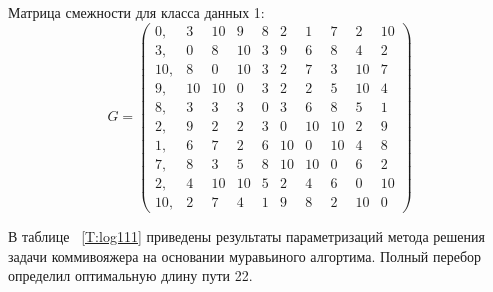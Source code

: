 \documentclass[a4paper,12pt]{article}
\begin{document}
		    Матрица смежности для класса данных 1:
		    \begin{equation*}
		    	G = 
			    \begin{pmatrix}
			    	0,      &3      &10     &9      &8      &2      &1      &7      &2      &10     \\
			    	3,      &0      &8      &10     &3      &9      &6      &8      &4      &2      \\
			    	10,     &8      &0      &10     &3      &2      &7      &3      &10     &7      \\
			    	9,      &10     &10     &0      &3      &2      &2      &5      &10     &4      \\
			    	8,      &3      &3      &3      &0      &3      &6      &8      &5      &1      \\
			    	2,      &9      &2      &2      &3      &0      &10     &10     &2      &9      \\
			    	1,      &6      &7      &2      &6      &10     &0      &10     &4      &8      \\
			    	7,      &8      &3      &5      &8      &10     &10     &0      &6      &2      \\
			    	2,      &4      &10     &10     &5      &2      &4      &6      &0      &10     \\
			    	10,     &2      &7      &4      &1      &9      &8      &2      &10     &0      
			    \end{pmatrix}
		    \end{equation*}
		    
		    В таблице ~\ref{T:log111} приведены результаты параметризаций метода решения задачи коммивояжера на основании муравьиного алгортима. Полный перебор определил оптимальную длину пути 22.
	
\end{document}
